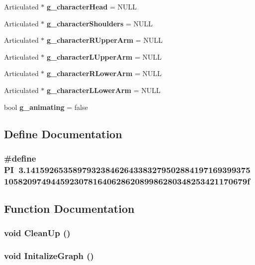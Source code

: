 \begin{DoxyCompactItemize}
\item 
Articulated $\ast$ {\bf g\_\-characterHead} = NULL
\item 
Articulated $\ast$ {\bf g\_\-characterShoulders} = NULL
\item 
Articulated $\ast$ {\bf g\_\-characterRUpperArm} = NULL
\item 
Articulated $\ast$ {\bf g\_\-characterLUpperArm} = NULL
\item 
Articulated $\ast$ {\bf g\_\-characterRLowerArm} = NULL
\item 
Articulated $\ast$ {\bf g\_\-characterLLowerArm} = NULL
\item 
bool {\bf g\_\-animating} = false
\end{DoxyCompactItemize}


\subsection{Define Documentation}
\subsubsection[{PI}]{\setlength{\rightskip}{0pt plus 5cm}\#define PI~3.1415926535897932384626433832795028841971693993751058209749445923078164062862089986280348253421170679f}\label{main_8cpp_a598a3330b3c21701223ee0ca14316eca}


\subsection{Function Documentation}
\subsubsection[{CleanUp}]{\setlength{\rightskip}{0pt plus 5cm}void CleanUp ()}\label{main_8cpp_abfc30f91ab75c6f4552003f777672e74}
\subsubsection[{InitalizeGraph}]{\setlength{\rightskip}{0pt plus 5cm}void InitalizeGraph ()}\label{main_8cpp_afc9f752ae6b418acf602bc0111458399}
